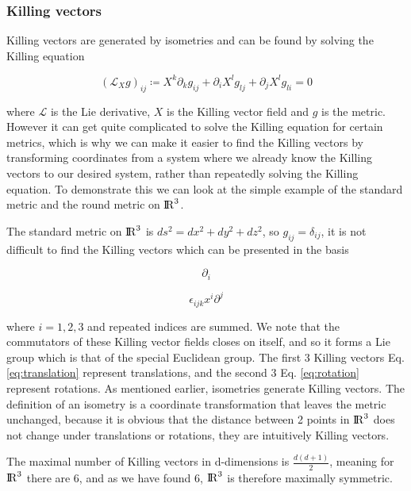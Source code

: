 \documentclass[a4paper,11pt]{article}
\numberwithin{equation}{section}
\numberwithin{figure}{section}
\begin{document}
\begin{large}
\subsubsection{Killing vectors}


Killing vectors are generated by isometries and can be found by solving the Killing equation

$$(\mathcal{L}_Xg)_{ij} \coloneqq X^k \partial _k g_{ij} + \partial _i X^l g_{lj} + \partial _j X^l g_{li}  = 0 $$


where $\mathcal{L}$ is the Lie derivative, $X$ is the Killing vector field and $g$ is the metric. However it can get quite complicated to solve the Killing equation for certain metrics, which is why we can make it easier to find the Killing vectors by transforming coordinates from a system where we already know the Killing vectors to our desired system, rather than repeatedly solving the Killing equation. To demonstrate this we can look at the simple example of the standard metric and the round metric on ${\rm I\!R}^3$.

The standard metric on ${\rm I\!R}^3$ is $ds^2=dx^2+dy^2+dz^2$, so $g_{ij}=\delta_{ij}$, it is not difficult to find the Killing vectors which can be presented in the basis

\begin{equation}
\label{eq:translation}
    \partial_i
\end{equation}

\begin{equation}
\label{eq:rotation}
    \epsilon_{ijk}x^i\partial^j
\end{equation}


where $i=1,2,3$ and repeated indices are summed. We note that the commutators of these Killing vector fields closes on itself, and so it forms a Lie group which is that of the special Euclidean group. The first 3 Killing vectors Eq. \eqref{eq:translation} represent translations, and the second 3 Eq. \eqref{eq:rotation} represent rotations. As mentioned earlier, isometries generate Killing vectors. The definition of an isometry is a coordinate transformation that leaves the metric unchanged, because it is obvious that the distance between 2 points in ${\rm I\!R}^3$ does not change under translations or rotations, they are intuitively Killing vectors.

The maximal number of Killing vectors in d-dimensions is $\frac{d(d+1)}{2}$, meaning for ${\rm I\!R}^3$ there are 6, and as we have found 6, ${\rm I\!R}^3$ is therefore maximally symmetric.



\end{large}
\end{document}
